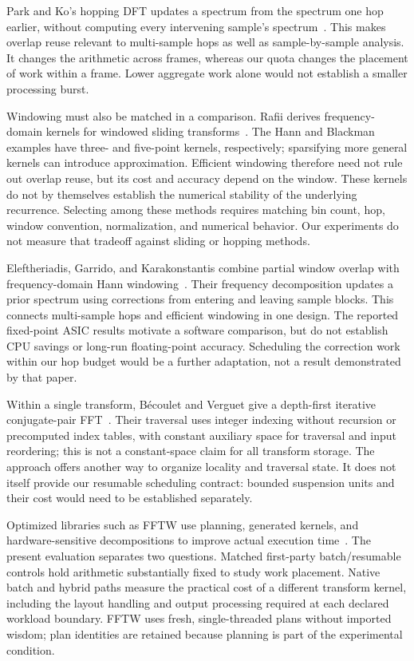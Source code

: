 Park and Ko's hopping DFT updates a spectrum from the spectrum one hop earlier,
without computing every intervening sample's spectrum~\cite{park2014}.
This makes overlap reuse relevant to multi-sample hops as well as sample-by-sample
analysis. It changes the arithmetic across frames, whereas our quota changes
the placement of work within a frame. Lower aggregate work alone would not
establish a smaller processing burst.

Windowing must also be matched in a comparison. Rafii derives frequency-domain
kernels for windowed sliding transforms~\cite{rafii2018}. The Hann and Blackman
examples have three- and five-point kernels, respectively; sparsifying more
general kernels can introduce approximation. Efficient windowing therefore
need not rule out overlap reuse, but its cost and accuracy depend on the window.
These kernels do not by themselves establish the numerical stability of the
underlying recurrence. Selecting among these methods requires matching bin
count, hop, window convention, normalization, and numerical behavior. Our
experiments do not measure that tradeoff against sliding or hopping methods.

Eleftheriadis, Garrido, and Karakonstantis combine partial window overlap with
frequency-domain Hann windowing~\cite{eleftheriadis2023}. Their frequency
decomposition updates a prior spectrum using corrections from entering and
leaving sample blocks. This connects multi-sample hops and efficient windowing
in one design. The reported fixed-point ASIC results motivate a software
comparison, but do not establish CPU savings or long-run floating-point
accuracy. Scheduling the correction work within our hop budget would be a
further adaptation, not a result demonstrated by that paper.

Within a single transform, B\'ecoulet and Verguet give a depth-first iterative
conjugate-pair FFT~\cite{becoulet2021}. Their traversal uses integer indexing
without recursion or precomputed index tables, with constant auxiliary space
for traversal and input reordering; this is not a constant-space claim for all
transform storage. The approach offers another way to organize locality and
traversal state. It does not itself provide our resumable scheduling contract:
bounded suspension units and their cost would need to be established separately.

Optimized libraries such as FFTW use planning, generated kernels, and
hardware-sensitive decompositions to improve actual execution
time~\cite{frigo2005}. The present evaluation separates two questions. Matched
first-party batch/resumable controls hold arithmetic substantially fixed to
study work placement. Native batch and hybrid paths measure the practical
cost of a different transform kernel, including the layout handling and output
processing required at each declared workload boundary. FFTW uses fresh,
single-threaded  plans without imported wisdom; plan
identities are retained because planning is part of the experimental condition.

